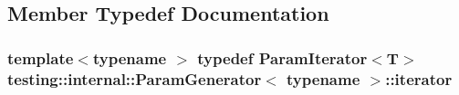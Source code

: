 \subsection{Member Typedef Documentation}
\hypertarget{classtesting_1_1internal_1_1ParamGenerator_ae54d0fb888817da53218c680919262fb}{
\subsubsection[{iterator}]{\setlength{\rightskip}{0pt plus 5cm}template$<$typename $>$ typedef {\bf Param\-Iterator}$<${\bf T}$>$ {\bf testing\-::internal\-::\-Param\-Generator}$<$ typename $>$\-::{\bf iterator}}}\label{classtesting_1_1internal_1_1ParamGenerator_ae54d0fb888817da53218c680919262fb}


